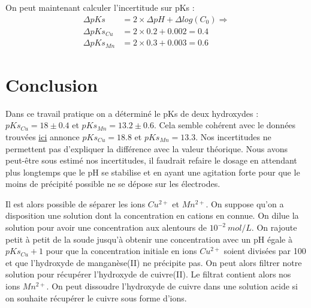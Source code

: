 \documentclass[12pt]{article}
\begin{document}
On peut maintenant calculer l'incertitude sur pKs :
\begin{align*}
\Delta pKs&= 2\times \Delta pH + \Delta log(C_0) \Longrightarrow\\
\Delta pKs_{Cu}&= 2 \times 0.2 + 0.002= 0.4 \\
\Delta pKs_{Mn}&= 2 \times 0.3 + 0.003 = 0.6
\end{align*}

\newpage
\section*{Conclusion}
Dans ce travail pratique on a déterminé le pKs de deux hydroxydes : $pKs_{Cu}=18\pm 0.4$ et $pKs_{Mn}=13.2\pm 0.6$. Cela semble cohérent avec le données trouvées \href{https://owl.oit.umass.edu/departments/Chemistry/appendix/ksp.html}{ici} annonce $pKs_{Cu}=18.8$ et $pKs_{Mn}=13.3$.
 Nos incertitudes ne permettent pas d'expliquer la différence avec la valeur théorique. Nous avons peut-être sous estimé nos incertitudes, il faudrait refaire le dosage en attendant plus longtemps que le pH se stabilise et en ayant une agitation forte pour que le moins de précipité possible ne se dépose sur les électrodes. 
 
Il est alors possible de séparer les ions $Cu^{2+}$ et $Mn^{2+}$. On suppose qu'on a disposition une solution dont la concentration en cations en connue. On dilue la solution pour avoir une concentration aux alentours de $10^{-2} \ mol/L$. On rajoute petit à petit de la soude jusqu'à obtenir une concentration avec un pH égale à $pKs_{Cu}+1$ pour que la concentration initiale en ions $Cu^{2+}$ soient divisées par 100 et que l'hydroxyde de manganèse(II) ne précipite pas. On peut alors filtrer notre solution pour récupérer l'hydroxyde de cuivre(II). Le filtrat contient alors nos ions $Mn^{2+}$. On peut dissoudre l'hydroxyde de cuivre dans une solution acide si on souhaite récupérer le cuivre sous forme d'ions. 
\end{document}
